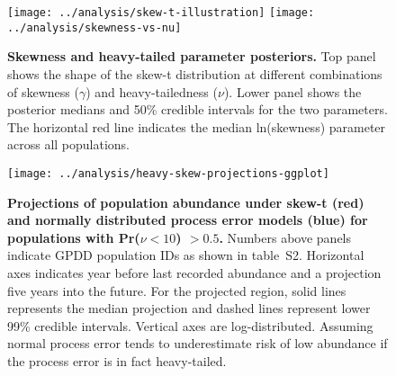 \documentclass[12pt]{article}
\begin{document}
\clearpage

\begin{figure}[htbp]
\begin{center}
\texttt{[image: ../analysis/skew-t-illustration]}
\texttt{[image: ../analysis/skewness-vs-nu]}

\caption{\textbf{Skewness and heavy-tailed parameter posteriors.} Top panel shows the shape of the skew-t distribution at different combinations of skewness ($\gamma$) and heavy-tailedness ($\nu$). Lower panel shows the posterior medians and 50\% credible intervals for the two parameters. The horizontal red line indicates the median ln(skewness) parameter across all populations.}

\label{fig:skew-nu}
\end{center}
\end{figure}

\begin{figure}[htbp]
\begin{center}
\texttt{[image: ../analysis/heavy-skew-projections-ggplot]}
\caption{\textbf{Projections of population abundance under skew-t (red) and
normally distributed process error models (blue) for populations with
Pr($\nu<10$) $>0.5$.} Numbers above panels indicate GPDD population IDs as
shown in table~S2. Horizontal axes indicates year before last
recorded abundance and a projection five years into the future. For the
projected region, solid lines represents the median projection and
dashed lines represent lower 99\% credible intervals. Vertical axes are
log-distributed. Assuming normal process error tends to underestimate risk of
low abundance if the process error is in fact heavy-tailed.}

\label{fig:skew-projections}
\end{center}
\end{figure}

%




%
%
%
\end{document}
